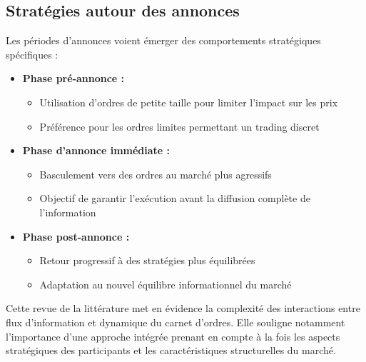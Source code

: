 \documentclass[12pt,a4paper]{article}
\theoremstyle{definition}
\theoremstyle{remark}
\begin{document}
    \subsection{Stratégies autour des annonces}

    Les périodes d'annonces voient émerger des comportements stratégiques spécifiques :

    \begin{itemize}
        \item \textbf{Phase pré-annonce :}
        \begin{itemize}
            \item Utilisation d'ordres de petite taille pour limiter l'impact sur les prix
            \item Préférence pour les ordres limites permettant un trading discret
        \end{itemize}
        
        \item \textbf{Phase d'annonce immédiate :}
        \begin{itemize}
            \item Basculement vers des ordres au marché plus agressifs
            \item Objectif de garantir l'exécution avant la diffusion complète de l'information
        \end{itemize}
        
        \item \textbf{Phase post-annonce :}
        \begin{itemize}
            \item Retour progressif à des stratégies plus équilibrées
            \item Adaptation au nouvel équilibre informationnel du marché
        \end{itemize}
    \end{itemize}

    Cette revue de la littérature met en évidence la complexité des interactions entre flux d'information et dynamique du carnet d'ordres. Elle souligne notamment l'importance d'une approche intégrée prenant en compte à la fois les aspects stratégiques des participants et les caractéristiques structurelles du marché.

    
\end{document}

